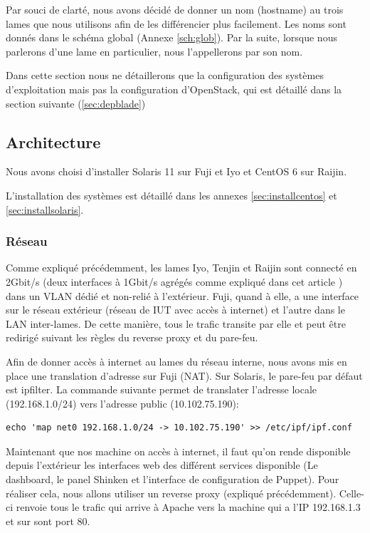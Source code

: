 \documentclass[a4paper,oneside]{report}
\begin{document}
Par souci de clarté, nous avons décidé de donner un nom (hostname) au trois lames que nous utilisons afin de les différencier plus facilement.
Les noms sont donnés dans le schéma global (Annexe \ref{sch:glob}).
Par la suite, lorsque nous parlerons d'une lame en particulier, nous l'appellerons par son nom.

Dans cette section nous ne détaillerons que la configuration des systèmes d'exploitation mais pas la configuration d'OpenStack, qui est détaillé dans la section suivante (\ref{sec:depblade})

\subsection{Architecture}
Nous avons choisi d'installer Solaris 11 sur Fuji et Iyo et CentOS 6 sur Raijin.

L'installation des systèmes est détaillé dans les annexes \ref{sec:installcentos} et \ref{sec:installsolaris}.

\subsubsection{Réseau}
Comme expliqué précédemment, les lames Iyo, Tenjin et Raijin sont connecté en 2Gbit/s (deux interfaces à 1Gbit/s agrégés comme expliqué dans cet article \cite{SolarisLA}) dans un VLAN dédié et non-relié à l'extérieur.
Fuji, quand à elle, a une interface sur le réseau extérieur (réseau de IUT avec accès à internet) et l'autre dans le LAN inter-lames.
De cette manière, tous le trafic transite par elle et peut être redirigé suivant les règles du reverse proxy et du pare-feu. 

Afin de donner accès à internet au lames du réseau interne, nous avons mis en place une translation d'adresse sur Fuji (NAT).
Sur Solaris, le pare-feu par défaut est ipfilter. La commande suivante permet de translater l'adresse locale (192.168.1.0/24) vers l'adresse public (10.102.75.190):
\begin{verbatim}
echo 'map net0 192.168.1.0/24 -> 10.102.75.190' >> /etc/ipf/ipf.conf
\end{verbatim}

Maintenant que nos machine on accès à internet, il faut qu'on rende disponible depuis l'extérieur les interfaces web des différent services disponible (Le dashboard, le panel Shinken et l'interface de configuration de Puppet).
Pour réaliser cela, nous allons utiliser un reverse proxy (expliqué précédemment).
Celle-ci renvoie tous le trafic qui arrive à Apache vers la machine qui a l'IP 192.168.1.3 et sur sont port 80.
\end{document}
